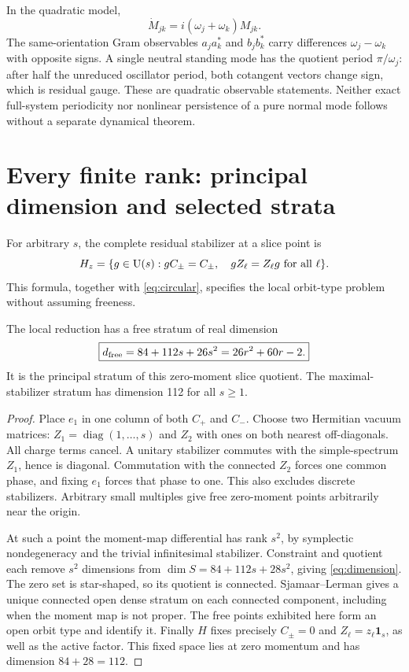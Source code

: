 \documentclass[11pt,a4paper]{article}
\newcommand{\id}{\mathbf1}\newcommand{\tr}{\operatorname{tr}}\newcommand{\diag}{\operatorname{diag}}\newcommand{\Rea}{\operatorname{Re}}
\begin{document}
In the quadratic model,
\[
\dot M_{jk}=i(\omega_j+\omega_k)M_{jk}.
\]
The same-orientation Gram observables $a_ja_k^*$ and $b_jb_k^*$ carry differences $\omega_j-\omega_k$ with opposite signs. A single neutral standing mode has the quotient period $\pi/\omega_j$: after half the unreduced oscillator period, both cotangent vectors change sign, which is residual gauge. These are quadratic observable statements. Neither exact full-system periodicity nor nonlinear persistence of a pure normal mode follows without a separate dynamical theorem.

\newpage
\section{Every finite rank: principal dimension and selected strata}
For arbitrary $s$, the complete residual stabilizer at a slice point is
\[
H_z=\{g\in\mathrm U(s):gC_\pm=C_\pm,\quad gZ_\ell=Z_\ell g\ \hbox{for all }\ell\}.
\]
This formula, together with \eqref{eq:circular}, specifies the local orbit-type problem without assuming freeness.

\begin{proposition}
The local reduction has a free stratum of real dimension
\begin{equation}
\boxed{d_{\rm free}=84+112s+26s^2=26r^2+60r-2.}\label{eq:dimension}
\end{equation}
It is the principal stratum of this zero-moment slice quotient. The maximal-stabilizer stratum has dimension 112 for all $s\ge1$.
\end{proposition}
\begin{proof}
Place $e_1$ in one column of both $C_+$ and $C_-$. Choose two Hermitian vacuum matrices: $Z_1=\diag(1,\ldots,s)$ and $Z_2$ with ones on both nearest off-diagonals. All charge terms cancel. A unitary stabilizer commutes with the simple-spectrum $Z_1$, hence is diagonal. Commutation with the connected $Z_2$ forces one common phase, and fixing $e_1$ forces that phase to one. This also excludes discrete stabilizers. Arbitrary small multiples give free zero-moment points arbitrarily near the origin.

At such a point the moment-map differential has rank $s^2$, by symplectic nondegeneracy and the trivial infinitesimal stabilizer. Constraint and quotient each remove $s^2$ dimensions from $\dim S=84+112s+28s^2$, giving \eqref{eq:dimension}. The zero set is star-shaped, so its quotient is connected. Sjamaar--Lerman \cite[Remark 5.10]{SL} gives a unique connected open dense stratum on each connected component, including when the moment map is not proper. The free points exhibited here form an open orbit type and identify it. Finally $H$ fixes precisely $C_\pm=0$ and $Z_\ell=z_\ell\id_s$, as well as the active factor. This fixed space lies at zero momentum and has dimension $84+28=112$.
\end{proof}
\end{document}
